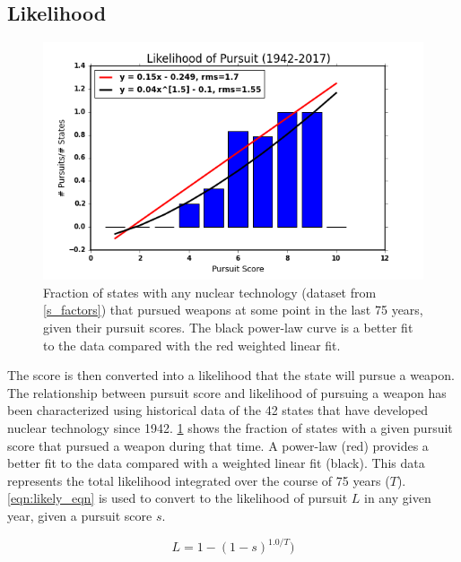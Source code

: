  \subsection{Likelihood}

\begin{figure}%
\begin{center}
\includegraphics[scale=0.8]{./figs/pe_likely.png}
\end{center}
\caption{Fraction of states with any nuclear technology (dataset from \ref{s_factors}) that pursued weapons at some point in the last 75 years, given their pursuit scores. The black power-law curve is a better fit to the data compared with the red weighted linear fit.}
\label{fig:likely}
\end{figure}
 
The score is then converted into a likelihood that the state will pursue a weapon. The relationship between pursuit score and likelihood of pursuing a weapon has been characterized using historical data of the 42 states that have developed nuclear technology since 1942.  \ref{fig:likely} shows the fraction of states with a given pursuit score that pursued a weapon during that time. A power-law (red) provides a better fit to the data compared with a weighted linear fit (black).  This data represents the total likelihood integrated over the course of 75 years ($T$). \ref{eqn:likely_eqn} is used to convert to the likelihood of pursuit $L$ in any given year, given a pursuit score $s$.

\begin{equation}
L = 1 - (1 - s)^{1.0/T})
\label{eqn:likely_eqn}
\end{equation}

